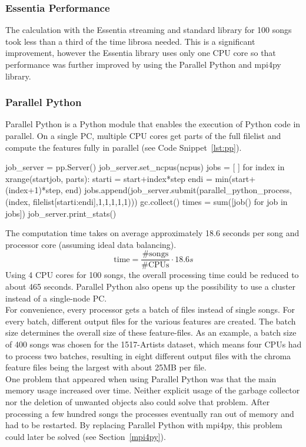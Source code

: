 \subsubsection{Essentia Performance}

The calculation with the Essentia streaming and standard library for 100 songs took less than a third of the time librosa needed. This is a significant improvement, however the Essentia library uses only one CPU core so that performance was further improved by using the Parallel Python and mpi4py library.

\subsubsection{Parallel Python}

Parallel Python is a Python module that enables the execution of Python code in parallel. On a single PC, multiple CPU cores get parts of the full filelist and compute the features fully in parallel (see Code Snippet~\ref{lst:pp}).
\begin{pythonCode}[frame=single,label={lst:pp},caption={Parallel Python},captionpos=b]
job_server = pp.Server()
job_server.set_ncpus(ncpus)
jobs = [ ]
for index in xrange(startjob, parts):
	starti = start+index*step
	endi = min(start+(index+1)*step, end)
	jobs.append(job_server.submit(parallel_python_process, (index, filelist[starti:endi],1,1,1,1,1)))
	gc.collect()
times = sum([job() for job in jobs])
job_server.print_stats()
\end{pythonCode}
The computation time takes on average approximately 18.6 seconds per song and processor core (assuming ideal data balancing).
\begin{equation} \label{eq:parallelp}
\text{time} = \frac{\#\text{songs}}{\#\text{CPUs}} \cdot 18.6s
\end{equation}
\noindent Using 4 CPU cores for 100 songs, the overall processing time could be reduced to about 465 seconds. 
Parallel Python also opens up the possibility to use a cluster instead of a single-node PC.\\
For convenience, every processor gets a batch of files instead of single songs. For every batch, different output files for the various features are created. The batch size determines the overall size of these feature-files. As an example, a batch size of 400 songs was chosen for the 1517-Artists dataset, which means four CPUs had to process two batches, resulting in eight different output files with the chroma feature files being the largest with about 25MB per file.\\
One problem that appeared when using Parallel Python was that the main memory usage increased over time. Neither explicit usage of the garbage collector nor the deletion of unwanted objects also could solve that problem. After processing a few hundred songs the processes eventually ran out of memory and had to be restarted. By replacing Parallel Python with mpi4py, this problem could later be solved (see Section~\ref{mpi4py}). 

